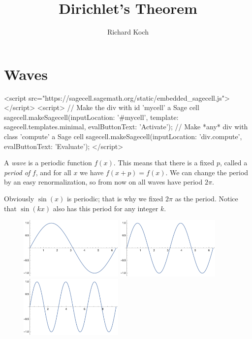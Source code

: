 \documentclass[11pt, oneside]{article}   	%
\title{Dirichlet's Theorem}
\author{Richard Koch}
\begin{document}
 \maketitle
 
\section{Waves} 

\ifx\HCode\undefined
\else

 \begin{html}
 <script src="https://sagecell.sagemath.org/static/embedded_sagecell.js"></script>
<script>
    // Make the div with id 'mycell' a Sage cell
    sagecell.makeSagecell({inputLocation:  '#mycell',
                            template:       sagecell.templates.minimal,
                           evalButtonText: 'Activate'});
    // Make *any* div with class 'compute' a Sage cell
    sagecell.makeSagecell({inputLocation: 'div.compute',
                           evalButtonText: 'Evaluate'});
    </script>
 \end{html}

\fi


A {\em wave} is a periodic function \(f(x)\). This means that there is a fixed \(p\), called a  {\em period of} \(f\), and for all \(x\) we have \(f(x + p) = f(x)\). We can change the period by an easy renormalization, so from now on all waves have period \(2 \pi\).

Obviously \(\sin(x)\) is periodic; that is why we fixed \(2 \pi\) as the period. Notice that \(\sin(kx)\) also has this period for any integer \(k\). 

\begin{figure}[htbp] %
   \centering
   \includegraphics[width=2in]{Graphics/sin1} \hspace{.5in}   \includegraphics[width=2in]{Graphics/sin2}
    \hspace{.5in}   \includegraphics[width=2in]{Graphics/sin3}
\end{figure}
\end{document}
